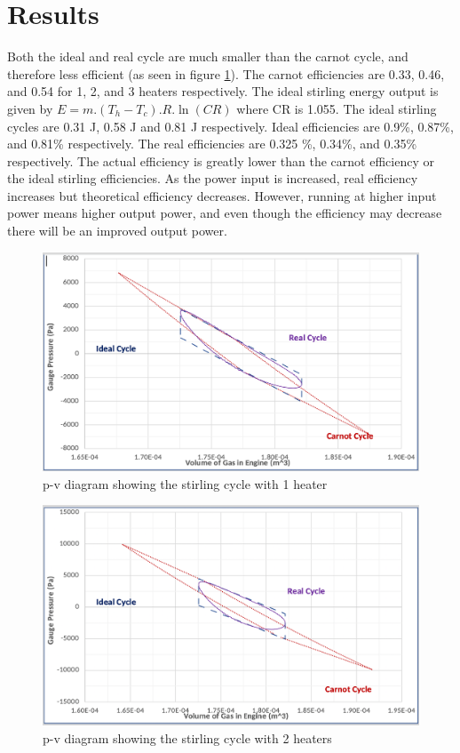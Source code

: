 \documentclass[12pt]{article}
\begin{document}
    \section{Results}
        Both the ideal and real cycle are much smaller than the carnot cycle, and therefore less efficient (as seen in figure \ref{cycle1}). The carnot efficiencies are 0.33, 0.46, and 0.54
        for 1, 2, and 3 heaters respectively. The ideal stirling energy output is given by $E = m.(T_h - T_c).R.\ln(CR)$ where CR is 1.055. The ideal stirling cycles are 0.31 J, 0.58 J and 0.81 J respectively. Ideal
        efficiencies are 0.9\%, 0.87\%, and 0.81\% respectively. The real efficiencies are 0.325 \%, 0.34\%, and 0.35\% respectively. 
        The actual efficiency is greatly lower than the carnot efficiency or the ideal stirling efficiencies. As the power input is increased, real efficiency increases but theoretical efficiency
        decreases. However, running at higher input power means higher output power, and even though the efficiency may decrease there will be an improved output power.
        \begin{figure}[H]
            \captionsetup{labelfont=bf}
            \includegraphics[width=40pc]{cycle1.png}
            \caption{p-v diagram showing the stirling cycle with 1 heater}\label{cycle1}
        \end{figure}
        \begin{figure}[H]
            \captionsetup{labelfont=bf}
            \includegraphics[width=40pc]{cycle2.png}
            \caption{p-v diagram showing the stirling cycle with 2 heaters}\label{cycle2}
        \end{figure}
\end{document}
